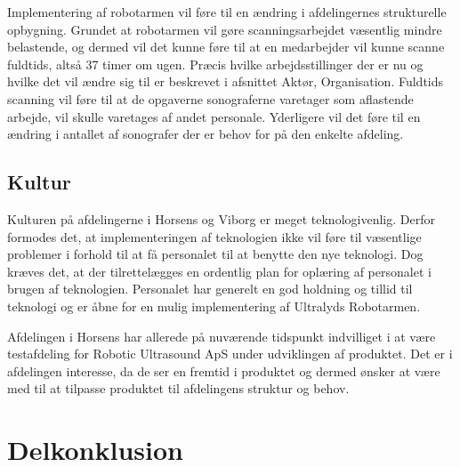 Implementering af robotarmen vil føre til en ændring i afdelingernes strukturelle opbygning. Grundet at robotarmen vil gøre scanningsarbejdet væsentlig mindre belastende, og dermed vil det kunne føre til at en medarbejder vil kunne scanne fuldtids, altså 37 timer om ugen. Præcis hvilke arbejdsstillinger der er nu og hvilke det vil ændre sig til er beskrevet i afsnittet Aktør, Organisation. Fuldtids scanning vil føre til at de opgaverne sonograferne varetager som aflastende arbejde, vil skulle varetages af andet personale. Yderligere vil det føre til en ændring i antallet af sonografer der er behov for på den enkelte afdeling.

\subsection{Kultur}
Kulturen på afdelingerne i Horsens og Viborg er meget teknologivenlig. Derfor formodes det, at implementeringen af teknologien ikke vil føre til væsentlige problemer i forhold til at få personalet til at benytte den nye teknologi. Dog kræves det, at der tilrettelægges en ordentlig plan for oplæring af personalet i brugen af teknologien. Personalet har generelt en god holdning og tillid til teknologi og er åbne for en mulig implementering af Ultralyds Robotarmen.

Afdelingen i Horsens har allerede på nuværende tidspunkt indvilliget i at være testafdeling for Robotic Ultrasound ApS under udviklingen af produktet. Det er i afdelingen interesse, da de ser en fremtid i produktet og dermed ønsker at være med til at tilpasse produktet til afdelingens struktur og behov.   

\section{Delkonklusion}

